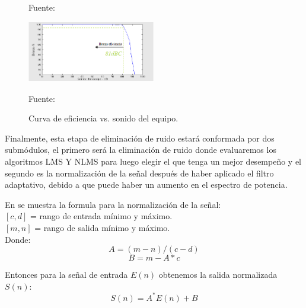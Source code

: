\begin{enumerate}
\begin{figure}[ht]
\begin{center}
{\small{Fuente: \cite{simon}}}
\end{center}
\end{figure}
\begin{figure}[ht]
\begin{center}
\includegraphics[width=0.5\textwidth]{Imagenes/Cap2/image024}
\end{center}
\begin{center}
\vskip -0.5cm
\caption{\small{Curva de eficiencia vs. sonido del equipo.}}
\label{fig:figura2.23}
{\small{Fuente: \cite{simon}}}
\end{center}
\end{figure}

Finalmente, esta etapa de eliminación de ruido estará conformada por dos submódulos, el primero será la eliminación de ruido donde evaluaremos los algoritmos LMS Y NLMS para luego elegir el que tenga un mejor desempeño y el segundo es la normalización de la señal después de haber aplicado el filtro adaptativo, debido a que puede haber un aumento en el espectro de potencia.

\newpage
En \cite{mathematics} se muestra la formula para la normalización de la señal:\\
$[c, d]$ = rango de entrada mínimo y máximo.\\
$[m, n]$ = rango de salida mínimo y máximo.\\
Donde:
\begin{equation}
\label{eq:ecuacion14}
A = (m-n)/(c-d)
\end{equation}
\vskip -1cm
\begin{equation}
\label{eq:ecuacion15}
B = m - A*c
\end{equation}

Entonces para la señal de entrada $E(n)$ obtenemos la salida normalizada $S(n)$:
\begin{equation}
\label{eq:ecuacion16}
S(n) = A^{*}E(n) + B
\end{equation}


\end{enumerate}
